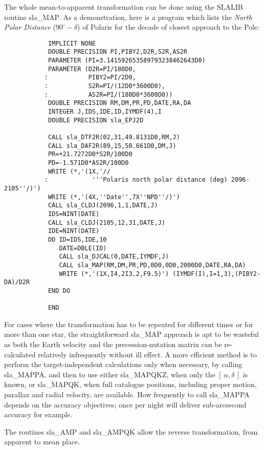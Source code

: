 \documentclass[11pt,twoside]{article}
\newcommand{\radec}     {$[\,\alpha,\delta\,]$}
\begin{document}
The whole mean-to-apparent transformation can be done using the SLALIB
routine
sla\_MAP.  As a demonstration, here is a program which lists the
{\it North Polar Distance}\/ ($90^\circ-\delta$) of Polaris for
the decade of closest approach to the Pole:
\goodbreak
\begin{verbatim}
            IMPLICIT NONE
            DOUBLE PRECISION PI,PIBY2,D2R,S2R,AS2R
            PARAMETER (PI=3.141592653589793238462643D0)
            PARAMETER (D2R=PI/180D0,
           :           PIBY2=PI/2D0,
           :           S2R=PI/(12D0*3600D0),
           :           AS2R=PI/(180D0*3600D0))
            DOUBLE PRECISION RM,DM,PR,PD,DATE,RA,DA
            INTEGER J,IDS,IDE,ID,IYMDF(4),I
            DOUBLE PRECISION sla_EPJ2D

            CALL sla_DTF2R(02,31,49.8131D0,RM,J)
            CALL sla_DAF2R(89,15,50.661D0,DM,J)
            PR=+21.7272D0*S2R/100D0
            PD=-1.571D0*AS2R/100D0
            WRITE (*,'(1X,'//
           :            '''Polaris north polar distance (deg) 2096-2105''/)')
            WRITE (*,'(4X,''Date'',7X''NPD''/)')
            CALL sla_CLDJ(2096,1,1,DATE,J)
            IDS=NINT(DATE)
            CALL sla_CLDJ(2105,12,31,DATE,J)
            IDE=NINT(DATE)
            DO ID=IDS,IDE,10
               DATE=DBLE(ID)
               CALL sla_DJCAL(0,DATE,IYMDF,J)
               CALL sla_MAP(RM,DM,PR,PD,0D0,0D0,2000D0,DATE,RA,DA)
               WRITE (*,'(1X,I4,2I3.2,F9.5)') (IYMDF(I),I=1,3),(PIBY2-DA)/D2R
            END DO

            END
\end{verbatim}
\goodbreak
For cases where the transformation has to be repeated for different
times or for more than one star, the straightforward
sla\_MAP
approach is apt to be
wasteful as both the Earth velocity and the
precession-nutation matrix can be re-calculated relatively
infrequently without ill effect.  A more efficient method is to
perform the target-independent calculations only when necessary,
by calling
sla\_MAPPA,
and then to use either
sla\_MAPQKZ,
when only the \radec\/ is known, or
sla\_MAPQK,
when full catalogue positions, including proper motion, parallax and
radial velocity, are available.  How frequently to call
sla\_MAPPA
depends on the accuracy objectives;  once per
night will deliver sub-arcsecond accuracy for example.

The routines
sla\_AMP
and
sla\_AMPQK
allow the reverse transformation, from apparent to mean place.
\end{document}

